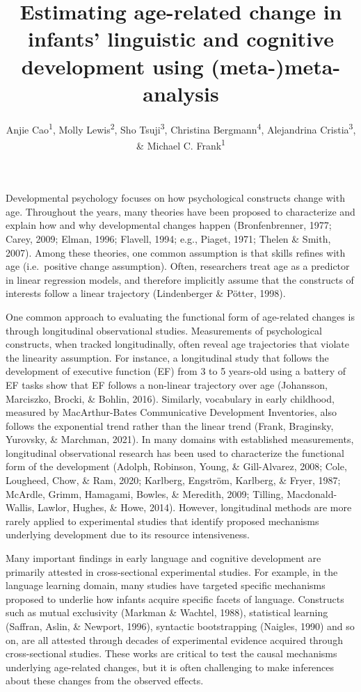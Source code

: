 \documentclass[
  man]{apa6}
\title{Estimating age-related change in infants' linguistic and cognitive development using (meta-)meta-analysis}
\author{Anjie Cao\textsuperscript{1}, Molly Lewis\textsuperscript{2}, Sho Tsuji\textsuperscript{3}, Christina Bergmann\textsuperscript{4}, Alejandrina Cristia\textsuperscript{3}, \& Michael C. Frank\textsuperscript{1}}
\date{}
\affiliation{\vspace{0.5cm}\textsuperscript{1} Stanford University\\\textsuperscript{2} Carnegie Mellon University\\\textsuperscript{3} École Normale Supérieure - PSL\\\textsuperscript{4} Hochschule Osnabrück}
\begin{document}
\maketitle

Developmental psychology focuses on how psychological constructs change with age. Throughout the years, many theories have been proposed to characterize and explain how and why developmental changes happen (Bronfenbrenner, 1977; Carey, 2009; Elman, 1996; Flavell, 1994; e.g., Piaget, 1971; Thelen \& Smith, 2007). Among these theories, one common assumption is that skills refines with age (i.e.~positive change assumption). Often, researchers treat age as a predictor in linear regression models, and therefore implicitly assume that the constructs of interests follow a linear trajectory (Lindenberger \& Pötter, 1998).

One common approach to evaluating the functional form of age-related changes is through longitudinal observational studies. Measurements of psychological constructs, when tracked longitudinally, often reveal age trajectories that violate the linearity assumption. For instance, a longitudinal study that follows the development of executive function (EF) from 3 to 5 years-old using a battery of EF tasks show that EF follows a non-linear trajectory over age (Johansson, Marciszko, Brocki, \& Bohlin, 2016). Similarly, vocabulary in early childhood, measured by MacArthur-Bates Communicative Development Inventories, also follows the exponential trend rather than the linear trend (Frank, Braginsky, Yurovsky, \& Marchman, 2021). In many domains with established measurements, longitudinal observational research has been used to characterize the functional form of the development (Adolph, Robinson, Young, \& Gill-Alvarez, 2008; Cole, Lougheed, Chow, \& Ram, 2020; Karlberg, Engström, Karlberg, \& Fryer, 1987; McArdle, Grimm, Hamagami, Bowles, \& Meredith, 2009; Tilling, Macdonald-Wallis, Lawlor, Hughes, \& Howe, 2014). However, longitudinal methods are more rarely applied to experimental studies that identify proposed mechanisms underlying development due to its resource intensiveness.

Many important findings in early language and cognitive development are primarily attested in cross-sectional experimental studies. For example, in the language learning domain, many studies have targeted specific mechanisms proposed to underlie how infants acquire specific facets of language. Constructs such as mutual exclusivity (Markman \& Wachtel, 1988), statistical learning (Saffran, Aslin, \& Newport, 1996), syntactic bootstrapping (Naigles, 1990) and so on, are all attested through decades of experimental evidence acquired through cross-sectional studies. These works are critical to test the causal mechanisms underlying age-related changes, but it is often challenging to make inferences about these changes from the observed effects.
\end{document}

